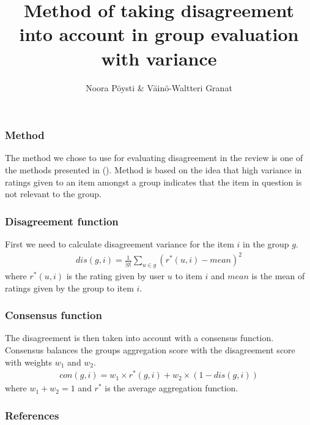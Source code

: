 \documentclass{beamer}
\title{Method of taking disagreement into account in group evaluation with variance}
\author{Noora Pöysti \& Väinö-Waltteri Granat}
\begin{document}
\frame{\titlepage}

\begin{frame}
    \frametitle{Method}
    The method we chose to use for evaluating disagreement in the review is one of the methods presented in (\cite{Amer-YahiaSihem2009Grsa}).
    Method is based on the idea that high variance in ratings given to an item amongst a group indicates that the item in question is not 
    relevant to the group. 
   \end{frame}

\begin{frame}
    \frametitle{Disagreement function}
    First we need to calculate disagreement variance for the item $i$ in the group $g$.
    \begin{align*}
        dis(g,i) = \frac{1}{|g|}\sum \limits _{u\in g} (r^{*}(u, i) - mean)^2
    \end{align*}
    where $r^*(u,i)$ is the rating given by user $u$ to item $i$ and $mean$ is the mean of ratings given by the group to item $i$.
\end{frame}

\begin{frame}
    \frametitle{Consensus function}
    The disagreement is then taken into account with
    a consensus function. Consensus balances the groups aggregation score with the disagreement score with weights $w_1$ and $w_2$.
    \begin{align*}
        con(g,i) = w_1 \times r^{*}(g,i) + w_2 \times (1-dis(g,i))
    \end{align*}
 where $w_1 + w_2 = 1$ and $r^{*}$ is the average aggregation function.
\end{frame}

\begin{frame}
   \frametitle{References} 
   \printbibliography
\end{frame}
\end{document}
